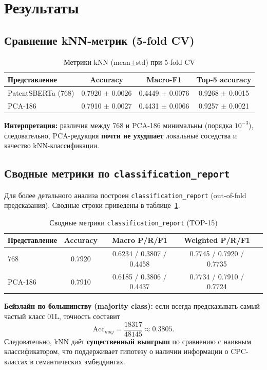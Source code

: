 \documentclass{article}
\begin{document}
\newpage
\section{Результаты}
\subsection{Сравнение kNN-метрик (5-fold CV)}
\begin{table}[h]
\centering
\caption{Метрики kNN (mean$\pm$std) при 5-fold CV}
\begin{tabular}{lccc}
\toprule
\textbf{Представление} & \textbf{Accuracy} & \textbf{Macro-F1} & \textbf{Top-5 accuracy} \\
\midrule
PatentSBERTa (768) & 0.7920 $\pm$ 0.0026 & 0.4449 $\pm$ 0.0076 & 0.9268 $\pm$ 0.0015 \\
PCA-186            & 0.7910 $\pm$ 0.0027 & 0.4431 $\pm$ 0.0066 & 0.9257 $\pm$ 0.0021 \\
\bottomrule
\end{tabular}
\end{table}

\textbf{Интерпретация:} различия между 768 и PCA-186 минимальны (порядка $10^{-3}$), следовательно, PCA-редукция \textbf{почти не ухудшает} локальные соседства и качество kNN-классификации.

\subsection{Сводные метрики по \texttt{classification\_report}}
Для более детального анализа построен \texttt{classification\_report} (out-of-fold предсказания). Сводные строки приведены в таблице~\ref{tab:summary}.

\begin{table}[h]
\centering
\caption{Сводные метрики \texttt{classification\_report} (TOP-15)}
\label{tab:summary}
\begin{tabular}{lcccc}
\toprule
\textbf{Представление} & \textbf{Accuracy} & \textbf{Macro P/R/F1} & \textbf{Weighted P/R/F1} \\
\midrule
768 & 0.7920 & 0.6234 / 0.3807 / 0.4458 & 0.7745 / 0.7920 / 0.7735 \\
PCA-186 & 0.7910 & 0.6185 / 0.3806 / 0.4437 & 0.7734 / 0.7910 / 0.7724 \\
\bottomrule
\end{tabular}
\end{table}

\textbf{Бейзлайн по большинству (majority class):} если всегда предсказывать самый частый класс 01L, точность составит
\[
\text{Acc}_{maj} = \frac{18317}{48145} \approx 0.3805.
\]
Следовательно, kNN даёт \textbf{существенный выигрыш} по сравнению с наивным классификатором, что поддерживает гипотезу о наличии информации о CPC-классах в семантических эмбеддингах.
\end{document}
